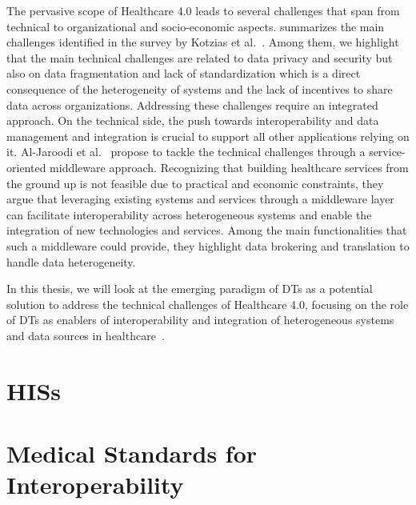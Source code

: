 The pervasive scope of Healthcare 4.0 leads to several challenges that span from technical to organizational and socio-economic aspects. 
%
 summarizes the main challenges identified in the survey by Kotzias et al.~\cite{Kotzias_Bukhsh_Arachchige_Daneva_Abhishta_2022}. 
%
Among them, we highlight that the main technical challenges are related to data privacy and security but also on data fragmentation and lack of standardization which is a direct consequence of the heterogeneity of systems and the lack of incentives to share data across organizations. 
%
Addressing these challenges require an integrated approach. 
%
On the technical side, the push towards interoperability and data management and integration is crucial to support all other applications relying on it.
%
Al-Jaroodi et al.~\cite{Al-Jaroodi_Mohamed_Abukhousa_2020} propose to tackle the technical challenges through a service-oriented middleware approach. 
%
Recognizing that building healthcare services from the ground up is not feasible due to practical and economic constraints, they argue that leveraging existing systems and services through a middleware layer can facilitate interoperability across heterogeneous systems and enable the integration of new technologies and services.
%
Among the main functionalities that such a middleware could provide, they highlight data brokering and translation to handle data heterogeneity. 

In this thesis, we will look at the emerging paradigm of \acp{DT} \cite{Semeraro_Lezoche_Panetto_Dassisti_2021} as a potential solution to address the technical challenges of Healthcare 4.0, focusing on the role of \acp{DT} as enablers of interoperability and integration of heterogeneous systems and data sources in healthcare~\cite{Alazab_Khan_Koppu_Ramu_M_Boobalan_Baker_Maddikunta_Gadekallu_Aljuhani_2023}.


\section{\aclp{HIS}}


\section{Medical Standards for Interoperability}

